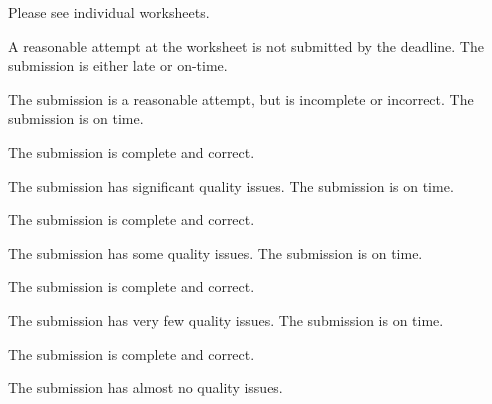 \documentclass{../../../fal_assignment}
\begin{document}
	Please see individual worksheets.
	
	
	\begin{markingrubric}
		\grade\fail	A reasonable attempt at the worksheet is not submitted by the deadline.
		\grade 		The submission is either late or on-time.
		\par		The submission is a reasonable attempt, but is incomplete or incorrect.
		\grade 		The submission is on time.
		\par 		The submission is complete and correct.
		\par		The submission has significant quality issues.
		\grade 		The submission is on time.
		\par 		The submission is complete and correct.
		\par		The submission has some quality issues.
		\grade 		The submission is on time.
		\par 		The submission is complete and correct.
		\par		The submission has very few quality issues.
		\grade 		The submission is on time.
		\par 		The submission is complete and correct.
		\par		The submission has almost no quality issues.
	\end{markingrubric}
	
\end{document}
